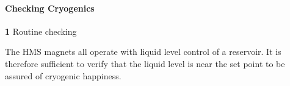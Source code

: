 \paragraph{Checking Cryogenics}

\begin{description}
\item{\bf 1}\hskip0.1in Routine checking
\item{}\hskip0.3in The HMS magnets all operate with liquid level control of a
reservoir. It is therefore sufficient to verify that the liquid level
is near the set point to be assured of cryogenic happiness.
\end{description}

